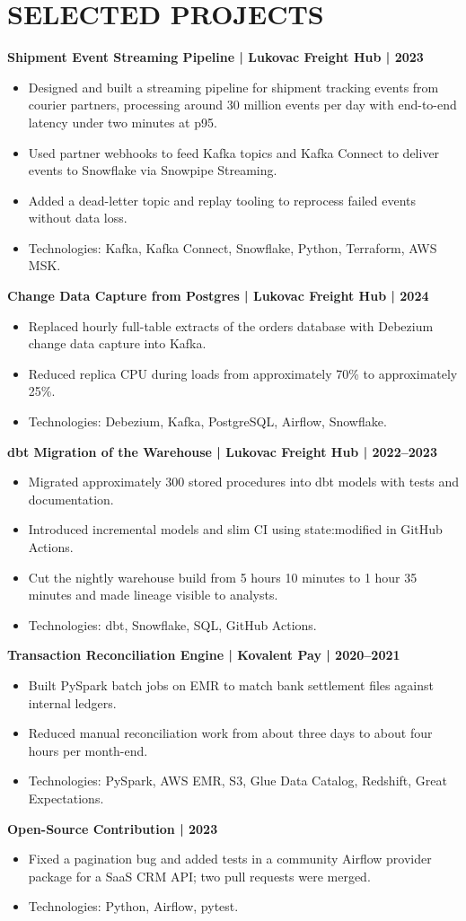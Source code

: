 \documentclass[11pt,a4paper]{article}
\begin{document}
\section*{SELECTED PROJECTS}
\textbf{Shipment Event Streaming Pipeline | Lukovac Freight Hub | 2023}
\begin{itemize}
\item Designed and built a streaming pipeline for shipment tracking events from courier partners, processing around 30 million events per day with end-to-end latency under two minutes at p95.
\item Used partner webhooks to feed Kafka topics and Kafka Connect to deliver events to Snowflake via Snowpipe Streaming.
\item Added a dead-letter topic and replay tooling to reprocess failed events without data loss.
\item Technologies: Kafka, Kafka Connect, Snowflake, Python, Terraform, AWS MSK.
\end{itemize}
\textbf{Change Data Capture from Postgres | Lukovac Freight Hub | 2024}
\begin{itemize}
\item Replaced hourly full-table extracts of the orders database with Debezium change data capture into Kafka.
\item Reduced replica CPU during loads from approximately 70\% to approximately 25\%.
\item Technologies: Debezium, Kafka, PostgreSQL, Airflow, Snowflake.
\end{itemize}
\textbf{dbt Migration of the Warehouse | Lukovac Freight Hub | 2022--2023}
\begin{itemize}
\item Migrated approximately 300 stored procedures into dbt models with tests and documentation.
\item Introduced incremental models and slim CI using state:modified in GitHub Actions.
\item Cut the nightly warehouse build from 5 hours 10 minutes to 1 hour 35 minutes and made lineage visible to analysts.
\item Technologies: dbt, Snowflake, SQL, GitHub Actions.
\end{itemize}
\textbf{Transaction Reconciliation Engine | Kovalent Pay | 2020--2021}
\begin{itemize}
\item Built PySpark batch jobs on EMR to match bank settlement files against internal ledgers.
\item Reduced manual reconciliation work from about three days to about four hours per month-end.
\item Technologies: PySpark, AWS EMR, S3, Glue Data Catalog, Redshift, Great Expectations.
\end{itemize}
\textbf{Open-Source Contribution | 2023}
\begin{itemize}
\item Fixed a pagination bug and added tests in a community Airflow provider package for a SaaS CRM API; two pull requests were merged.
\item Technologies: Python, Airflow, pytest.
\end{itemize}
\end{document}
